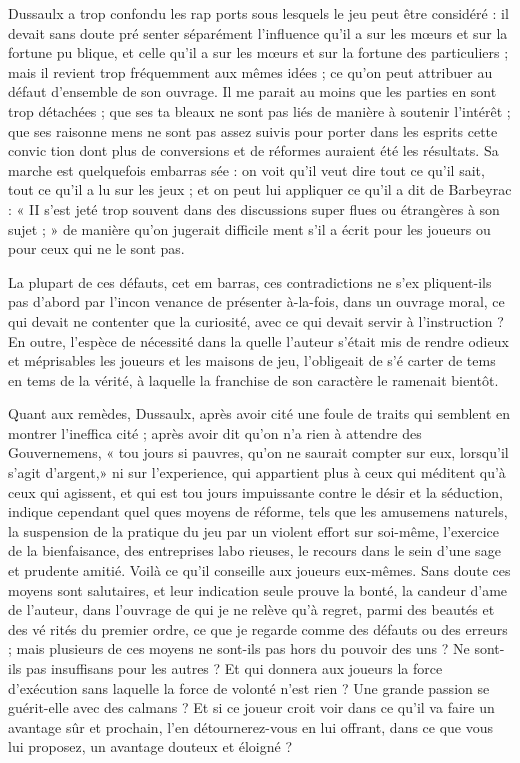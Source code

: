 Dussaulx a trop confondu les rap%
ports sous lesquels le jeu peut être
considéré : il devait sans doute pré%
senter séparément l'influence qu'il a
sur les mœurs et sur la fortune pu%
blique, et celle qu'il a sur les mœurs
et sur la fortune des particuliers ;
mais il revient trop fréquemment aux
mêmes idées ; ce qu'on peut attribuer
au défaut d'ensemble de son ouvrage.
Il me parait au moins que les parties
en sont trop détachées ; que ses ta%
bleaux ne sont pas liés de manière à
soutenir l'intérêt ; que ses raisonne%
mens ne sont pas assez suivis pour
porter dans les esprits cette convic%
tion dont plus de conversions et de
réformes auraient été les résultats.
Sa marche est quelquefois embarras%
sée : on voit qu'il veut dire tout ce
qu'il sait, tout ce qu'il a lu sur les
jeux ; et on peut lui appliquer ce qu'il
a dit de Barbeyrac : « II s'est jeté trop
souvent dans des discussions super%
flues ou étrangères à son sujet ; »
de manière qu'on jugerait difficile%
ment s'il a écrit pour les joueurs ou
pour ceux qui ne le sont pas.

La plupart de ces défauts, cet em%
barras, ces contradictions ne s'ex%
pliquent-ils pas d'abord par l'incon%
venance de présenter à-la-fois, dans
un ouvrage moral, ce qui devait ne
contenter que la curiosité, avec ce
qui devait servir à l'instruction ? En
outre, l'espèce de nécessité dans la%
quelle l'auteur s'était mis de rendre
odieux et méprisables les joueurs et
les maisons de jeu, l'obligeait de s'é%
carter de tems en tems de la vérité, à
laquelle la franchise de son caractère
le ramenait bientôt.

Quant aux remèdes, Dussaulx,
après avoir cité une foule de traits
qui semblent en montrer l'ineffica%
cité ; après avoir dit qu'on n'a rien à
attendre des Gouvernemens, « tou%
jours si pauvres, qu'on ne saurait
compter sur eux, lorsqu'il s'agit
d'argent,» ni sur l'experience, qui
appartient plus à ceux qui méditent
qu'à ceux qui agissent, et qui est tou%
jours impuissante contre le désir et la
séduction, indique cependant quel%
ques moyens de réforme, tels que les
amusemens naturels, la suspension
de la pratique du jeu par un violent
effort sur soi-même, l'exercice de la
bienfaisance, des entreprises labo%
rieuses, le recours dans le sein d'une
sage et prudente amitié. Voilà ce qu'il
conseille aux joueurs eux-mêmes.
Sans doute ces moyens sont salutaires,
et leur indication seule prouve la
bonté, la candeur d'ame de l'auteur,
dans l'ouvrage de qui je ne relève qu'à
regret, parmi des beautés et des vé%
rités du premier ordre, ce que je
regarde comme des défauts ou des
erreurs ; mais plusieurs de ces moyens
ne sont-ils pas hors du pouvoir des
uns ? Ne sont-ils pas insuffisans pour
les autres ? Et qui donnera aux joueurs
la force d'exécution sans laquelle la
force de volonté n'est rien ? Une
grande passion se guérit-elle avec des
calmans ? Et si ce joueur croit voir
dans ce qu'il va faire un avantage sûr
et prochain, l'en détournerez-vous
en lui offrant, dans ce que vous lui
proposez, un avantage douteux et
éloigné ?


